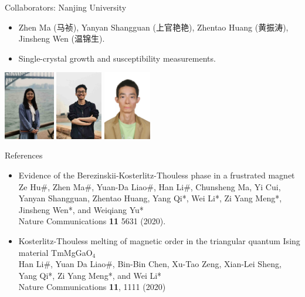 \documentclass[xcolor=table, aspectratio=1610,ignorenonframetext]{beamer}
\begin{document}
\begin{frame}{Collaborators: Nanjing University}
\begin{itemize}
	\item Zhen Ma (马祯), Yanyan Shangguan (上官艳艳), Zhentao Huang (黄振涛), Jinsheng Wen (温锦生).
	\item Single-crystal growth and susceptibility measurements.
\end{itemize}
	\begin{center}
		\includegraphics[height=3cm]{../people/yanyanshangguan}
		\includegraphics[height=3cm]{../people/zhentaohuang}
		\includegraphics[height=3cm]{../people/jinshengwen}
	\end{center}
\end{frame}

\begin{frame}{References}
\begin{itemize}
	\item Evidence of the Berezinskii-Kosterlitz-Thouless phase in a frustrated magnet\\
Ze Hu\#, Zhen Ma\#, Yuan-Da Liao\#, Han Li\#, Chunsheng Ma, Yi Cui, Yanyan Shangguan, Zhentao Huang, Yang Qi*, Wei Li*, Zi Yang Meng*, Jinsheng Wen*, and Weiqiang Yu*\\
Nature Communications \textbf{11} 5631 (2020).
	\item Kosterlitz-Thouless melting of magnetic order in the triangular quantum Ising material TmMgGaO${}_4$\\
Han Li\#, Yuan Da Liao\#, Bin-Bin Chen, Xu-Tao Zeng, Xian-Lei Sheng, Yang Qi*, Zi Yang Meng*, and Wei Li*\\
Nature Communications \textbf{11}, 1111 (2020)
\end{itemize}
\end{frame}
\end{document}

